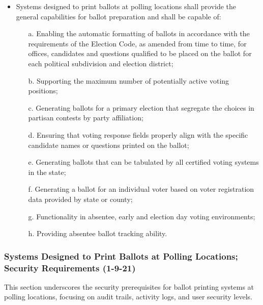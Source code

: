 \documentclass{article}
\begin{document}
\begin{itemize}
    \item Systems designed to print ballots at polling locations shall provide the general capabilities for ballot preparation and shall be capable of:
    \begin{itemize}
        \item[a.] Enabling the automatic formatting of ballots in accordance with the requirements of the Election Code, as amended from time to time, for offices, candidates and questions qualified to be placed on the ballot for each political subdivision and election district;
        \item[b.] Supporting the maximum number of potentially active voting positions;
        \item[c.] Generating ballots for a primary election that segregate the choices in partisan contests by party affiliation;
        \item[d.] Ensuring that voting response fields properly align with the specific candidate names or questions printed on the ballot;
        \item[e.] Generating ballots that can be tabulated by all certified voting systems in the state;
        \item[f.] Generating a ballot for an individual voter based on voter registration data provided by state or county;
        \item[g.] Functionality in absentee, early and election day voting environments;
        \item[h.] Providing absentee ballot tracking ability.
    \end{itemize}
\end{itemize}

\subsubsection{Systems Designed to Print Ballots at Polling Locations; Security Requirements (1-9-21)}
This section underscores the security prerequisites for ballot printing systems at polling locations, focusing on audit trails, activity logs, and user security levels.
\end{document}
